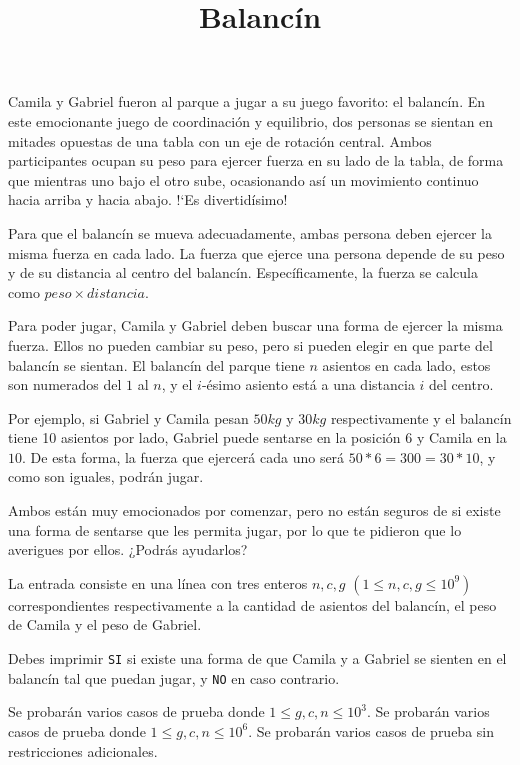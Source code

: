 \documentclass{oci}
\title{Balancín}
\begin{document}
\begin{problemDescription}
    Camila y Gabriel fueron al parque a jugar a su juego favorito: el balancín.
    En este emocionante juego de coordinación y equilibrio, dos personas se
    sientan en mitades opuestas de una tabla con un eje de rotación central.
    Ambos participantes ocupan su peso para ejercer fuerza en su lado de la tabla,
    de forma que mientras uno bajo el otro sube, ocasionando así un movimiento
    continuo hacia arriba y hacia abajo.
    !`Es divertidísimo!

    Para que el balancín se mueva adecuadamente, ambas persona deben ejercer
    la misma fuerza en cada lado.
    La fuerza que ejerce una persona depende de su peso y de su distancia
    al centro del balancín.
    Específicamente, la fuerza se calcula como $peso \times distancia$.

    Para poder jugar, Camila y Gabriel deben buscar una forma de ejercer
    la misma fuerza.
    Ellos no pueden cambiar su peso, pero si pueden elegir en que parte
    del balancín se sientan.
    El balancín del parque tiene $n$ asientos en cada lado,
    estos son numerados del $1$ al $n$,
    y el $i$-ésimo asiento está a una distancia $i$ del centro.

    Por ejemplo, si Gabriel y Camila pesan $50kg$ y $30kg$
    respectivamente y el balancín tiene 10 asientos por lado,
    Gabriel puede sentarse en la posición $6$ y Camila en la $10$.
    De esta forma, la fuerza que ejercerá cada uno será $50*6=300=30*10$,
    y como son iguales, podrán jugar.

    Ambos están muy emocionados por comenzar, pero no están seguros de si
    existe una forma de sentarse que les permita jugar, por lo que te pidieron
    que lo averigues por ellos. ¿Podrás ayudarlos?

\end{problemDescription}

\begin{inputDescription}
    La entrada consiste en una línea con tres enteros $n, c, g$
    $(1 \leq n, c, g \leq 10^9)$ correspondientes respectivamente
    a la cantidad de asientos del balancín, el peso de Camila
    y el peso de Gabriel.
\end{inputDescription}

\begin{outputDescription}
	Debes imprimir \texttt{SI} si existe una forma de que Camila
	y a Gabriel se sienten en el balancín tal que puedan jugar,
    y \texttt{NO} en caso contrario.
\end{outputDescription}

\begin{scoreDescription}
	 Se probarán varios casos de prueba donde $1 \leq g, c, n \leq 10^3$.
	 Se probarán varios casos de prueba donde $1 \leq g, c, n \leq 10^6$.
	 Se probarán varios casos de prueba sin restricciones adicionales.
\end{scoreDescription}

\begin{sampleDescription}
\end{sampleDescription}
\end{document}
